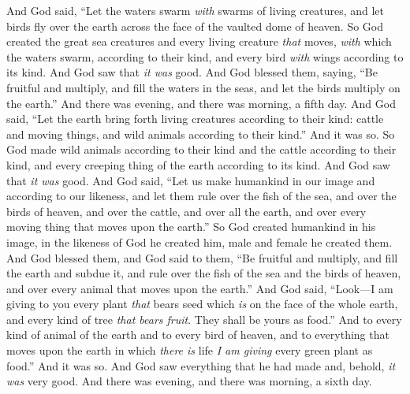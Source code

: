 \begin{biblechapter}
\verse And God said, “Let the waters swarm \textit{with} swarms of living creatures, and let birds fly over the earth across the face of the vaulted dome of heaven.
\verse So God created the great sea creatures and every living creature \textit{that} moves, \textit{with} which the waters swarm, according to their kind, and every bird \textit{with} wings according to its kind. And God saw that \textit{it was} good.
\verse And God blessed them, saying, “Be fruitful and multiply, and fill the waters in the seas, and let the birds multiply on the earth.”
\verse And there was evening, and there was morning, a fifth day.
\verse And God said, “Let the earth bring forth living creatures according to their kind: cattle and moving things, and wild animals according to their kind.” And it was so.
\verse So God made wild animals according to their kind and the cattle according to their kind, and every creeping thing of the earth according to its kind. And God saw that \textit{it was} good.
\verse And God said, “Let us make humankind in our image and according to our likeness, and let them rule over the fish of the sea, and over the birds of heaven, and over the cattle, and over all the earth, and over every moving thing that moves upon the earth.”
\verse So God created humankind in his image, in the likeness of God he created him, male and female he created them.
\verse And God blessed them, and God said to them, “Be fruitful and multiply, and fill the earth and subdue it, and rule over the fish of the sea and the birds of heaven, and over every animal that moves upon the earth.”
\verse And God said, “Look—I am giving to you every plant \textit{that} bears seed which \textit{is} on the face of the whole earth, and every kind of tree \textit{that bears fruit}. They shall be yours as food.”
\verse And to every kind of animal of the earth and to every bird of heaven, and to everything that moves upon the earth in which \textit{there is} life \textit{I am giving} every green plant as food.” And it was so.
\verse And God saw everything that he had made and, behold, \textit{it was} very good. And there was evening, and there was morning, a sixth day.
\end{biblechapter}

